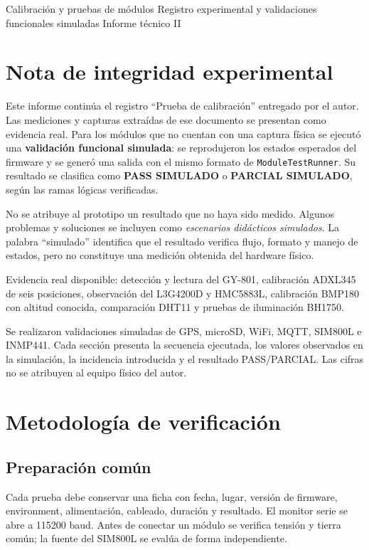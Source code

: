 \documentclass[11pt,a4paper,oneside]{report}
\begin{document}
\VScover
  {Calibración y pruebas de módulos}
  {Registro experimental y validaciones funcionales simuladas}
  {Informe técnico II}

\chapter*{Nota de integridad experimental}
Este informe continúa el registro ``Prueba de calibración'' entregado por el autor.
Las mediciones y capturas extraídas de ese documento se presentan como evidencia real.
Para los módulos que no cuentan con una captura física se ejecutó una
\textbf{validación funcional simulada}: se reprodujeron los estados esperados del
firmware y se generó una salida con el mismo formato de \texttt{ModuleTestRunner}.
Su resultado se clasifica como \textbf{PASS SIMULADO} o
\textbf{PARCIAL SIMULADO}, según las ramas lógicas verificadas.

No se atribuye al prototipo un resultado que no haya sido medido. Algunos problemas y
soluciones se incluyen como \emph{escenarios didácticos simulados}. La palabra
``simulado'' identifica que el resultado verifica flujo, formato y manejo de estados,
pero no constituye una medición obtenida del hardware físico.

\begin{vsevidence}
Evidencia real disponible: detección y lectura del GY-801, calibración ADXL345 de seis
posiciones, observación del L3G4200D y HMC5883L, calibración BMP180 con altitud
conocida, comparación DHT11 y pruebas de iluminación BH1750.
\end{vsevidence}

\begin{vssimtest}
Se realizaron validaciones simuladas de GPS, microSD, WiFi, MQTT, SIM800L e INMP441.
Cada sección presenta la secuencia ejecutada, los valores observados en la simulación,
la incidencia introducida y el resultado PASS/PARCIAL. Las cifras no se atribuyen al
equipo físico del autor.
\end{vssimtest}

\tableofcontents
\listoffigures
\clearpage
{}

\chapter{Metodología de verificación}

\section{Preparación común}
Cada prueba debe conservar una ficha con fecha, lugar, versión de firmware,
environment, alimentación, cableado, duración y resultado. El monitor serie se abre a
115200 baud. Antes de conectar un módulo se verifica tensión y tierra común; la fuente
del SIM800L se evalúa de forma independiente.
\end{document}
